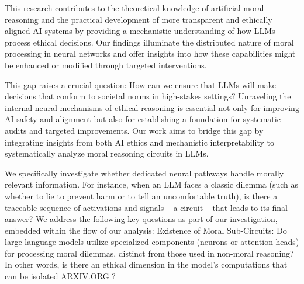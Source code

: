 This research contributes to the theoretical knowledge of artificial moral reasoning and the practical development of more transparent and ethically aligned AI systems by providing a mechanistic understanding of how LLMs process ethical decisions. Our findings illuminate the distributed nature of moral processing in neural networks and offer insights into how these capabilities might be enhanced or modified through targeted interventions.




This gap raises a crucial question: How can we ensure that LLMs will make decisions that conform to societal norms in high-stakes settings? Unraveling the internal neural mechanisms of ethical reasoning is essential not only for improving AI safety and alignment but also for establishing a foundation for systematic audits and targeted improvements. Our work aims to bridge this gap by integrating insights from both AI ethics and mechanistic interpretability to systematically analyze moral reasoning circuits in LLMs.








We specifically investigate whether dedicated neural pathways handle morally relevant information. For instance, when an LLM faces a classic dilemma (such as whether to lie to prevent harm or to tell an uncomfortable truth), is there a traceable sequence of activations and signals – a circuit – that leads to its final answer? We address the following key questions as part of our investigation, embedded within the flow of our analysis:
Existence of Moral Sub-Circuits: Do large language models utilize specialized components (neurons or attention heads) for processing moral dilemmas, distinct from those used in non-moral reasoning? In other words, is there an ethical dimension in the model’s computations that can be isolated​
ARXIV.ORG
?


